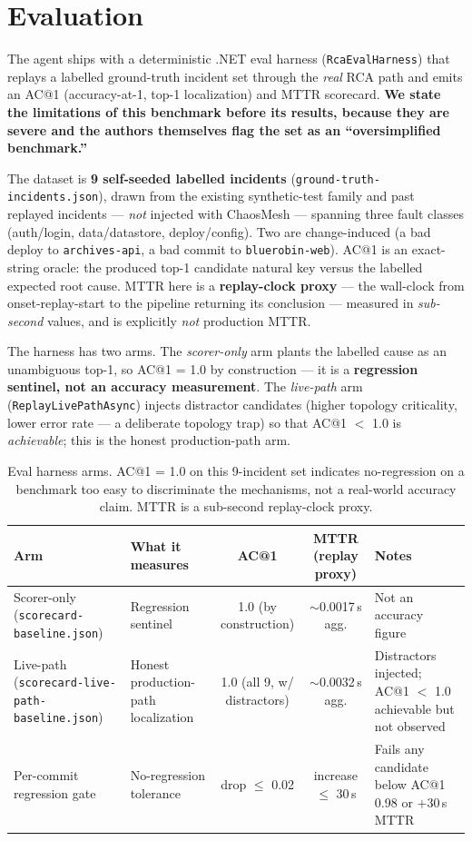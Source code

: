 \documentclass[11pt]{article}
\begin{document}
\section{Evaluation}

The agent ships with a deterministic .NET eval harness
(\texttt{RcaEvalHarness}) that replays a labelled ground-truth incident set
through the \emph{real} RCA path and emits an AC@1 (accuracy-at-1, top-1
localization) and MTTR scorecard. \textbf{We state the limitations of this
benchmark before its results, because they are severe and the authors
themselves flag the set as an ``oversimplified benchmark.''}

The dataset is \textbf{9 self-seeded labelled incidents}
(\texttt{ground-truth-incidents.json}), drawn from the existing
synthetic-test family and past replayed incidents --- \emph{not} injected with
ChaosMesh --- spanning three fault classes (auth/login, data/datastore,
deploy/config). Two are change-induced (a bad deploy to \texttt{archives-api},
a bad commit to \texttt{bluerobin-web}). AC@1 is an exact-string oracle: the
produced top-1 candidate natural key versus the labelled expected root cause.
MTTR here is a \textbf{replay-clock proxy} --- the wall-clock from
onset-replay-start to the pipeline returning its conclusion --- measured in
\emph{sub-second} values, and is explicitly \emph{not} production MTTR.

The harness has two arms. The \emph{scorer-only} arm plants the labelled cause
as an unambiguous top-1, so AC@1 = 1.0 by construction --- it is a
\textbf{regression sentinel, not an accuracy measurement}. The
\emph{live-path} arm (\texttt{ReplayLivePathAsync}) injects distractor
candidates (higher topology criticality, lower error rate --- a deliberate
topology trap) so that AC@1 $<$ 1.0 is \emph{achievable}; this is the honest
production-path arm.

\begin{table}[ht]
\centering
\caption{Eval harness arms. AC@1 = 1.0 on this 9-incident set indicates
no-regression on a benchmark too easy to discriminate the mechanisms, not a
real-world accuracy claim. MTTR is a sub-second replay-clock proxy.}
\label{tab:arms}
\begin{tabular}{p{3.2cm}p{3.0cm}ccp{3.2cm}}
\toprule
Arm & What it measures & AC@1 & MTTR (replay proxy) & Notes \\
\midrule
Scorer-only (\texttt{scorecard-baseline.json}) & Regression sentinel & 1.0 (by construction) & $\sim$0.0017\,s agg. & Not an accuracy figure \\
Live-path (\texttt{scorecard-live-path-baseline.json}) & Honest production-path localization & 1.0 (all 9, w/ distractors) & $\sim$0.0032\,s agg. & Distractors injected; AC@1 $<$ 1.0 achievable but not observed \\
Per-commit regression gate & No-regression tolerance & drop $\leq$ 0.02 & increase $\leq$ 30\,s & Fails any candidate below AC@1 0.98 or $+$30\,s MTTR \\
\bottomrule
\end{tabular}
\end{table}
\end{document}
